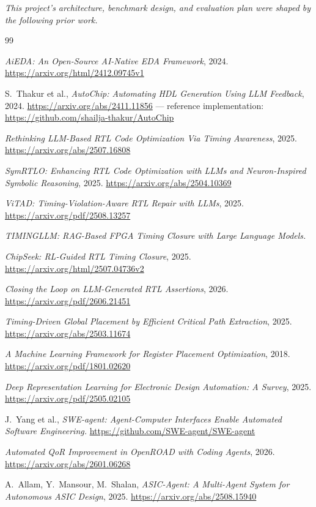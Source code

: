 \documentclass[11pt]{article}
\begin{document}
\renewcommand{\refname}{References}
\noindent\textit{This project's architecture, benchmark design, and
evaluation plan were shaped by the following prior work.}

{\small
\begin{thebibliography}{99}

 \emph{AiEDA: An Open-Source AI-Native EDA Framework}, 2024.
\url{https://arxiv.org/html/2412.09745v1}

 S.~Thakur et al., \emph{AutoChip: Automating HDL Generation
Using LLM Feedback}, 2024. \url{https://arxiv.org/abs/2411.11856} ---
reference implementation: \url{https://github.com/shailja-thakur/AutoChip}

 \emph{Rethinking LLM-Based RTL Code Optimization Via
Timing Awareness}, 2025. \url{https://arxiv.org/abs/2507.16808}

 \emph{SymRTLO: Enhancing RTL Code Optimization with LLMs and
Neuron-Inspired Symbolic Reasoning}, 2025.
\url{https://arxiv.org/abs/2504.10369}

 \emph{ViTAD: Timing-Violation-Aware RTL Repair with LLMs},
2025. \url{https://arxiv.org/pdf/2508.13257}

 \emph{TIMINGLLM: RAG-Based FPGA Timing Closure with Large
Language Models.}

 \emph{ChipSeek: RL-Guided RTL Timing Closure}, 2025.
\url{https://arxiv.org/html/2507.04736v2}

 \emph{Closing the Loop on LLM-Generated RTL Assertions},
2026. \url{https://arxiv.org/pdf/2606.21451}

 \emph{Timing-Driven Global Placement by Efficient Critical
Path Extraction}, 2025. \url{https://arxiv.org/abs/2503.11674}

 \emph{A Machine Learning Framework for Register Placement
Optimization}, 2018. \url{https://arxiv.org/pdf/1801.02620}

 \emph{Deep Representation Learning for Electronic Design
Automation: A Survey}, 2025. \url{https://arxiv.org/pdf/2505.02105}

 J.~Yang et al., \emph{SWE-agent: Agent-Computer Interfaces
Enable Automated Software Engineering.}
\url{https://github.com/SWE-agent/SWE-agent}

 \emph{Automated QoR Improvement in OpenROAD with Coding
Agents}, 2026. \url{https://arxiv.org/abs/2601.06268}

 A.~Allam, Y.~Mansour, M.~Shalan, \emph{ASIC-Agent: A
Multi-Agent System for Autonomous ASIC Design}, 2025.
\url{https://arxiv.org/abs/2508.15940}

\end{thebibliography}
}
\end{document}
